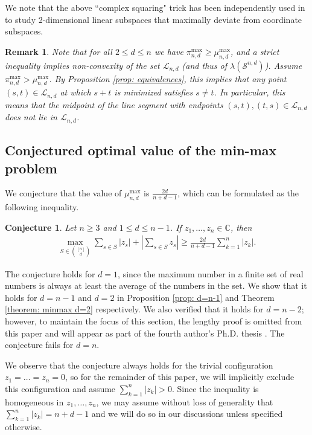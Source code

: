 \documentclass[reqno,hidelinks,11pt]{amsart}
\numberwithin{equation}{section}
\newtheorem{remark}[theorem]{Remark}
\newtheorem{conjecture}[theorem]{Conjecture}
\def\CC{\mathbb{C}}
\def\S{\mathcal{S}}
\begin{document}
We note that the above ``complex squaring" trick has been independently used in \cite{nesterenko2024submatrices} to study 2-dimensional linear subspaces that maximally deviate from coordinate subspaces.

\begin{remark} \label{rem: strict implies nonconvex}
Note that for all $2 \leq d \leq n$ we have $\pi_{n,d}^{\max} \geq \mu_{n,d}^{\max}$, and a strict inequality implies non-convexity of the set $\mathcal{L}_{n,d}$ (and thus of $\lambda(\S^{n,d})$). Assume $\pi_{n,d}^{\max} > \mu_{n,d}^{\max}$. By Proposition \ref{prop: equivalences}, this implies that any point $(s, t) \in \mathcal{L}_{n,d}$ at which $s + t$ is minimized satisfies $s \neq t$. In particular, this means that the midpoint of the line segment with endpoints $(s, t), (t, s) \in \mathcal{L}_{n,d}$ does not lie in $\mathcal{L}_{n,d}$.
\end{remark}

\subsection{Conjectured optimal value of the min-max problem} \label{sec:Conjectured optimal value}
We conjecture that the value of $\mu_{n,d}^{\max}$ is $\frac{2d}{n + d - 1}$, which can be formulated as the following inequality.
\begin{conjecture}\label{conjecture: optimal configurations}
Let $n\ge3$ and $1\le d\le n-1$. If $z_1,\dots,z_n\in\CC$, then
    \begin{align}\label{ineq: conj}
        \max_{S\in\binom{[n]}{d}}\sum_{s\in S}|z_s|+\left|\sum_{s\in S} z_s\right|\ge\frac{2d}{n+d-1}\sum_{k=1}^n|z_k|.
    \end{align}
\end{conjecture}

The conjecture holds for $d=1$, since the maximum number in a finite set of real numbers is always at least the average of the numbers in the set. We show that it holds for $d = n - 1$ and $d = 2$ in Proposition \ref{prop: d=n-1} and Theorem \ref{theorem: minmax d=2} respectively. We also verified that it holds for $d = n - 2$; however, to maintain the focus of this section, the lengthy proof is omitted from this paper and will appear as part of the fourth author’s Ph.D. thesis \cite{lee2026}. The conjecture fails for $d=n$. 

We observe that the conjecture always holds for the trivial configuration $z_1 = \ldots = z_n = 0$, so for the remainder of this paper, we will implicitly exclude this configuration and assume $\sum_{k=1}^n |z_k| > 0$. Since the inequality is homogeneous in $z_1, \ldots, z_n$, we may assume without loss of generality that $\sum_{k=1}^n |z_k| = n + d - 1$ and we will do so in our discussions unless specified otherwise.
\end{document}
